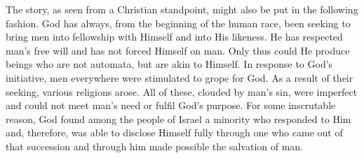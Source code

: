 The story, as seen from a Christian standpoint, might also be put in the following fashion. God has always, from the beginning of the human race, been seeking to bring men into fellowship with Himself and into His likeness. He has respected man's free will and has not forced Himself on man. Only thus could He produce beings who are not automata, but are akin to Himself. In response to God's initiative, men everywhere were stimulated to grope for God. As a result of their seeking, various religions arose. All of these, clouded by man's sin, were imperfect and could not meet man's need or fulfil God's purpose. For some inscrutable reason, God found among the people of Israel a minority who responded to Him and, therefore, was able to disclose Himself fully through one who came out of that succession and through him made possible the salvation of man.
